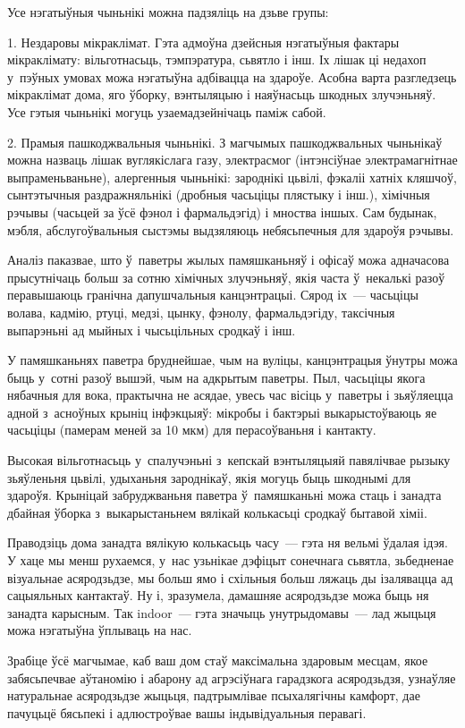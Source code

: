 Усе нэгатыўныя чыньнікі можна падзяліць на дзьве групы:

1. Нездаровы мікраклімат. Гэта адмоўна дзейсныя нэгатыўныя фактары мікраклімату: вільготнасьць, тэмпэратура, сьвятло і інш. Іх лішак ці недахоп у~пэўных умовах можа нэгатыўна адбівацца на здароўе. Асобна варта разгледзець мікраклімат дома, яго ўборку, вэнтыляцыю і наяўнасьць шкодных злучэньняў. Усе гэтыя чыньнікі могуць узаемадзейнічаць паміж сабой.

2. Прамыя пашкоджвальныя чыньнікі. З магчымых пашкоджвальных чыньнікаў можна назваць лішак вуглякіслага газу, электрасмог (інтэнсіўнае электрамагнітнае выпраменьваньне), алергенныя чыньнікі: зароднікі цьвілі, фэкаліі хатніх кляшчоў, сынтэтычныя раздражняльнікі (дробныя часьціцы плястыку і інш.), хімічныя рэчывы (часьцей за ўсё фэнол і фармальдэгід) і мноства іншых. Сам будынак, мэбля, абслугоўвальныя сыстэмы выдзяляюць небясьпечныя для здароўя рэчывы.

Аналіз паказвае, што ў~паветры жылых памяшканьняў і офісаў можа адначасова прысутнічаць больш за сотню хімічных злучэньняў, якія часта ў~некалькі разоў перавышаюць гранічна дапушчальныя канцэнтрацыі. Сярод іх~--- часьціцы волава, кадмію, ртуці, медзі, цынку, фэнолу, фармальдэгіду, таксічныя выпарэньні ад мыйных і чысьцільных сродкаў і інш.

У памяшканьнях паветра бруднейшае, чым на вуліцы, канцэнтрацыя ўнутры можа быць у~сотні разоў вышэй, чым на адкрытым паветры. Пыл, часьціцы якога нябачныя для вока, практычна не асядае, увесь час вісіць у~паветры і зьяўляецца адной з~асноўных крыніц інфэкцыяў: мікробы і бактэрыі выкарыстоўваюць яе часьціцы (памерам меней за 10 мкм) для перасоўваньня і кантакту.

Высокая вільготнасьць у~спалучэньні з~кепскай вэнтыляцыяй павялічвае рызыку зьяўленьня цьвілі, удыханьня зароднікаў, якія могуць быць шкоднымі для здароўя. Крыніцай забруджваньня паветра ў~памяшканьні можа стаць і занадта дбайная ўборка з~выкарыстаньнем вялікай колькасьці сродкаў бытавой хіміі.

Праводзіць дома занадта вялікую колькасьць часу~--- гэта ня вельмі ўдалая ідэя. У хаце мы менш рухаемся, у~нас узьнікае дэфіцыт сонечнага сьвятла, зьбедненае візуальнае асяродзьдзе, мы больш ямо і схільныя больш ляжаць ды ізалявацца ад сацыяльных кантактаў. Ну і, зразумела, дамашняе асяродзьдзе можа быць ня занадта карысным. Так indoor~--- гэта значыць унутрыдомавы~--- лад жыцьця можа нэгатыўна ўплываць на нас.

Зрабіце ўсё магчымае, каб ваш дом стаў максімальна здаровым месцам, якое забясьпечвае аўтаномію і абарону ад агрэсіўнага гарадзкога асяродзьдзя, узнаўляе натуральнае асяродзьдзе жыцьця, падтрымлівае псыхалягічны камфорт, дае пачуцьцё бясьпекі і адлюстроўвае вашы індывідуальныя перавагі.

